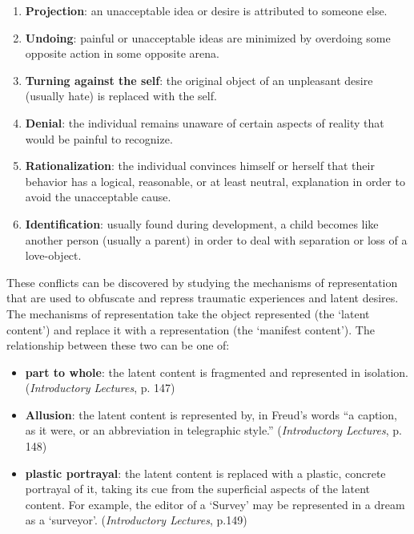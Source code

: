 \begin{refsection}
\begin{enumerate}
\item \textbf{Projection}: an unacceptable idea or desire is attributed to someone else.

\item \textbf{Undoing}: painful or unacceptable ideas are minimized by overdoing some opposite action in some opposite arena.

\item \textbf{Turning against the self}: the original object of an unpleasant desire (usually hate) is replaced with the self.

\item \textbf{Denial}: the individual remains unaware of certain aspects of reality that would be painful to recognize.

\item \textbf{Rationalization}: the individual convinces himself or herself that their behavior has a logical, reasonable, or at least neutral, explanation in order to avoid the unacceptable cause.

\item \textbf{Identification}: usually found during development, a child becomes like another person (usually a parent) in order to deal with separation or loss of a love-object.

\end{enumerate}

These conflicts can be discovered by studying the mechanisms of representation that are used to obfuscate and repress traumatic experiences and latent desires. The mechanisms of representation take the object represented (the `latent content') and replace it with a representation (the `manifest content'). The relationship between these two can be one of:

\begin{itemize}
\item \textbf{part to whole}: the latent content is fragmented and represented in isolation. (\emph{Introductory Lectures}, p. 147)

\item \textbf{Allusion}: the latent content is represented by, in Freud's words ``a caption, as it were, or an abbreviation in telegraphic style.'' (\emph{Introductory Lectures}, p. 148)

\item \textbf{plastic portrayal}: the latent content is replaced with a plastic, concrete portrayal of it, taking its cue from the superficial aspects of the latent content. For example, the editor of a `Survey' may be represented in a dream as a `surveyor'. (\emph{Introductory Lectures}, p.149)


\end{itemize}
\end{refsection}
